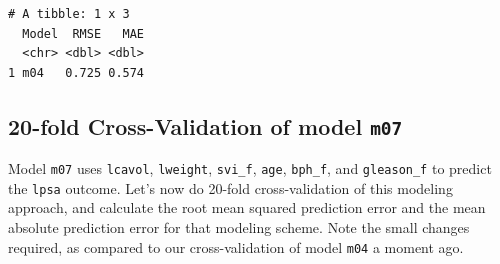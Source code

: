 \documentclass[]{book}
\newenvironment{Shaded}{\begin{snugshade}}{\end{snugshade}}
\newcommand{\KeywordTok}[1]{\textcolor[rgb]{0.13,0.29,0.53}{\textbf{#1}}}
\newcommand{\DataTypeTok}[1]{\textcolor[rgb]{0.13,0.29,0.53}{#1}}
\newcommand{\DecValTok}[1]{\textcolor[rgb]{0.00,0.00,0.81}{#1}}
\newcommand{\StringTok}[1]{\textcolor[rgb]{0.31,0.60,0.02}{#1}}
\newcommand{\OperatorTok}[1]{\textcolor[rgb]{0.81,0.36,0.00}{\textbf{#1}}}
\newcommand{\NormalTok}[1]{#1}
\theoremstyle{definition}
\theoremstyle{definition}
\theoremstyle{definition}
\theoremstyle{remark}
\begin{document}
\begin{verbatim}
# A tibble: 1 x 3
  Model  RMSE   MAE
  <chr> <dbl> <dbl>
1 m04   0.725 0.574
\end{verbatim}

\subsection{\texorpdfstring{20-fold Cross-Validation of model
\texttt{m07}}{20-fold Cross-Validation of model m07}}\label{fold-cross-validation-of-model-m07}

Model \texttt{m07} uses \texttt{lcavol}, \texttt{lweight},
\texttt{svi\_f}, \texttt{age}, \texttt{bph\_f}, and \texttt{gleason\_f}
to predict the \texttt{lpsa} outcome. Let's now do 20-fold
cross-validation of this modeling approach, and calculate the root mean
squared prediction error and the mean absolute prediction error for that
modeling scheme. Note the small changes required, as compared to our
cross-validation of model \texttt{m04} a moment ago.

\begin{Shaded}
\end{Shaded}
\end{document}
